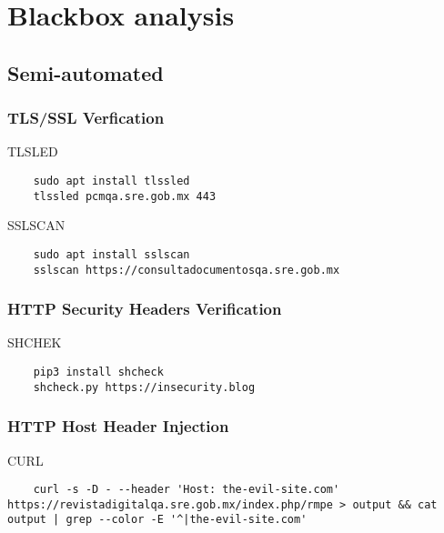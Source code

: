\documentclass[letterpaper,12pt]{extarticle}
\title{}
\author{}
\begin{document}
\tableofcontents
\newpage

\maketitle

\begin{abstract}

\end{abstract}

\section{Blackbox analysis}

\subsection{Semi-automated}

\subsubsection{TLS/SSL Verfication}

TLSLED
\begin{verbatim}
	sudo apt install tlssled
	tlssled pcmqa.sre.gob.mx 443
\end{verbatim}

SSLSCAN
\begin{verbatim}
	sudo apt install sslscan
	sslscan https://consultadocumentosqa.sre.gob.mx
\end{verbatim}

\subsubsection{HTTP Security Headers Verification}

SHCHEK
\begin{verbatim}
	pip3 install shcheck
	shcheck.py https://insecurity.blog
\end{verbatim}

\subsubsection{HTTP Host Header Injection}

CURL
\begin{verbatim}
	curl -s -D - --header 'Host: the-evil-site.com' https://revistadigitalqa.sre.gob.mx/index.php/rmpe > output && cat output | grep --color -E '^|the-evil-site.com' 
\end{verbatim}
\end{document}
